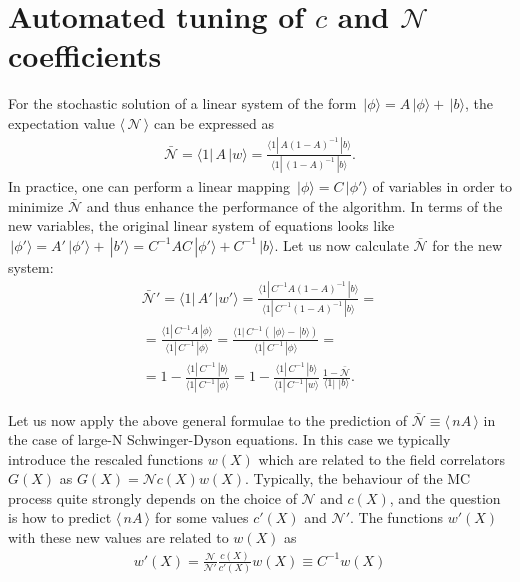 \documentclass[twocolumn,showpacs,preprintnumbers,superscriptaddress,amsmath,floatfix,amssymb,secnumarabic]{revtex4}
\newcommand{\lr}[1]{ \left( #1 \right) }
\newcommand{\vev}[1]{ \langle \, #1 \, \rangle }
\newcommand{\ket}[1]{ \, | #1 \rangle }
\newcommand{\bra}[1]{ \langle #1 | \, }
\begin{document}
\section{Automated tuning of $c$ and $\mathcal{N}$ coefficients}

 For the stochastic solution of a linear system of the form $\ket{\phi} = A \ket{\phi} + \ket{b}$, the expectation value $\vev{\mathcal{N}}$ can be expressed as
\begin{eqnarray}
\label{mean_nA}
 \bar{\mathcal{N}} = \bra{1} A \ket{w} = \frac{\bra{1} A \lr{1 - A}^{-1} \ket{b}}{\bra{1} \lr{1 - A}^{-1} \ket{b}} .
\end{eqnarray}
In practice, one can perform a linear mapping $\ket{\phi} = C \ket{\phi'}$ of variables in order to minimize $\bar{\mathcal{N}}$ and thus enhance the performance of the algorithm. In terms of the new variables, the original linear system of equations looks like $\ket{\phi'} = A' \ket{\phi'} + \ket{b'} = C^{-1} A C \ket{\phi'} + C^{-1} \ket{b}$. Let us now calculate $\bar{\mathcal{N}}$ for the new system:
\begin{eqnarray}
\label{mean_nA_new}
 \bar{\mathcal{N}}' = \bra{1} A' \ket{w'}
 =
 \frac{\bra{1} C^{-1} A \lr{1 - A}^{-1} \ket{b}}{\bra{1} C^{-1} \lr{1 - A}^{-1} \ket{b}}
 = \nonumber \\ =
 \frac{\bra{1} C^{-1} A \ket{\phi}}{\bra{1} C^{-1} \ket{\phi}}
 =
 \frac{\bra{1} C^{-1} \lr{\ket{\phi} - \ket{b}} }{\bra{1} C^{-1} \ket{\phi}}
 = \nonumber \\ =
 1 - \frac{\bra{1} C^{-1} \ket{b}}{\bra{1} C^{-1} \ket{\phi}}
 =
 1 - \frac{\bra{1} C^{-1} \ket{b}}{\bra{1} C^{-1} \ket{w}} \, \frac{1 - \bar{\mathcal{N}}}{\bra{1}\ket{b}}.
\end{eqnarray}

 Let us now apply the above general formulae to the prediction of $\bar{\mathcal{N}} \equiv \vev{nA}$ in the case of large-N Schwinger-Dyson equations. In this case we typically introduce the rescaled functions $w\lr{X}$ which are related to the field correlators $G\lr{X}$ as $G\lr{X} = \mathcal{N} c\lr{X} w\lr{X}$. Typically, the behaviour of the MC process quite strongly depends on the choice of $\mathcal{N}$ and $c\lr{X}$, and the question is how to predict $\vev{nA}$ for some values $c'\lr{X}$ and $\mathcal{N}'$. The functions $w'\lr{X}$ with these new values are related to $w\lr{X}$ as
\begin{eqnarray}
\label{wnew_wold}
 w'\lr{X} = \frac{\mathcal{N}}{\mathcal{N}'} \frac{c\lr{X}}{c'\lr{X}} w\lr{X} \equiv C^{-1} w\lr{X}
\end{eqnarray}
\end{document}
